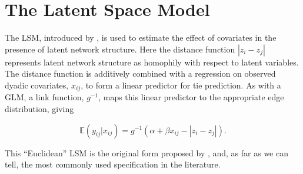 \documentclass[11pt]{article}
\newcommand{\R}{\textsf{R}\space} %
\begin{document}

\section{The Latent Space Model}

The LSM, introduced by \citet{hoff2002latent}, is used to estimate the
effect of covariates in the presence of latent network structure. Here
the distance function $|z_i - z_j|$ represents latent network
structure as homophily with respect to latent variables.  The distance
function is additively combined with a regression on observed dyadic
covariates, $x_{ij}$, to form a linear predictor for tie prediction.
As with a GLM, a link function, $g^{-1}$, maps this linear predictor
to the appropriate edge distribution, giving

$$\mathbb{E}(y_{ij} | x_{ij}) = g^{-1}(\alpha + \beta x_{ij} - |z_i - z_j|).$$

This ``Euclidean'' LSM is the original form proposed by
\citet{hoff2002latent}, and, as far as we can tell, the most commonly
used specification in the literature.

\end{document}
